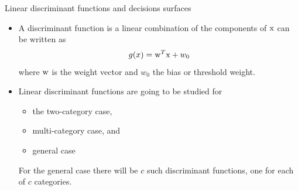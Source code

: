 \begin{frame}{Linear discriminant functions and decisions surfaces}
\begin{itemize}
\item A discriminant function is a linear combination of the components of ${\rm x}$ can be written as
\begin{equation}
g(x)={\rm w}^T{\rm x}+w_0 \nonumber
\end{equation}
where ${\rm w}$ is the weight vector and $w_0$ the bias or threshold weight.
\item Linear discriminant functions are going to be studied for 
\begin{itemize}
\item the two-category case,
\item multi-category case, and
\item general case
\end{itemize} 
For the general case
there will be $c$ such discriminant functions, one for each of $c$ categories.\nocite{duda2012pattern}
\end{itemize}
\end{frame}


